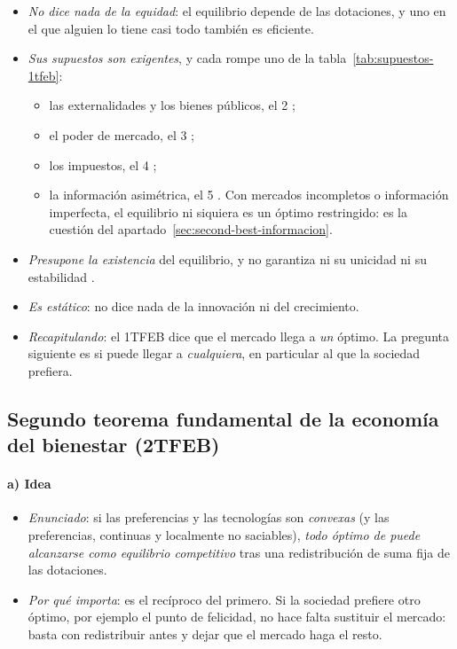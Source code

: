 \documentclass[11pt]{article}
\begin{document}
\begin{itemize}
\item \emph{No dice nada de la equidad}: el equilibrio depende de las dotaciones, y uno en el que alguien lo tiene casi todo también es eficiente.
\item \emph{Sus supuestos son exigentes}, y cada  rompe uno de la tabla~\ref{tab:supuestos-1tfeb}:
  \begin{itemize}
  \item las externalidades y los bienes públicos, el 2 ;
  \item el poder de mercado, el 3   ;
  \item los impuestos, el 4 ;
  \item la información asimétrica, el 5 . Con mercados incompletos o información imperfecta, el equilibrio ni siquiera es un óptimo restringido\nocite{GreenwaldStiglitz1986Externalities}: es la cuestión del apartado~\ref{sec:second-best-informacion}.
  \end{itemize}
\item \emph{Presupone la existencia} del equilibrio, y no garantiza ni su unicidad ni su estabilidad .
\item \emph{Es estático}: no dice nada de la innovación ni del crecimiento.
\item \emph{Recapitulando}: el 1TFEB dice que el mercado llega a \emph{un} óptimo. La pregunta siguiente es si puede llegar a \emph{cualquiera}, en particular al que la sociedad prefiera.
\end{itemize}

\subsection{Segundo teorema fundamental de la economía del bienestar (2TFEB)}\label{sec:segundo-teorema}

\paragraph{a) Idea}

\begin{itemize}
\item \emph{Enunciado}: si las preferencias y las tecnologías son \emph{convexas} (y las preferencias, continuas y localmente no saciables), \emph{todo óptimo de  puede alcanzarse como equilibrio competitivo} tras una redistribución de suma fija de las dotaciones\nocite{Arrow1951Extension,Debreu1954Valuation}.
\item \emph{Por qué importa}: es el recíproco del primero. Si la sociedad prefiere otro óptimo, por ejemplo el punto de felicidad, no hace falta sustituir el mercado: basta con redistribuir antes y dejar que el mercado haga el resto.
\end{itemize}
\end{document}
